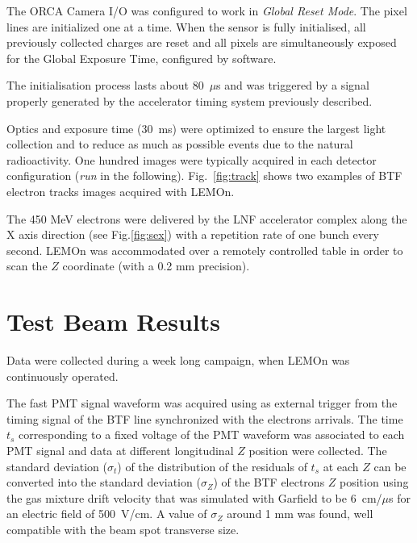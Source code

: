 \documentclass[review]{elsarticle}
\begin{document}
The ORCA Camera I/O was configured to work in {\it Global Reset Mode}. The pixel lines are initialized one at a time. When the sensor is fully initialised, all previously collected charges are reset and all pixels are simultaneously exposed  for the Global Exposure Time, configured by software. 

The initialisation process lasts about 80~$\mu$s and was triggered by a signal properly generated by the accelerator timing system previously described.



Optics and exposure time (30~ms) were optimized to ensure the largest light collection and to reduce as much as possible events due to the natural radioactivity. One hundred images were typically acquired in each detector configuration ({\it run} in the following). 
Fig.~\ref{fig:track} shows two examples of BTF electron tracks images acquired with LEMOn.

The 450 MeV electrons were delivered by the LNF accelerator complex  along the X axis direction (see Fig.\ref{fig:sex})  with a repetition rate of one bunch every  second. LEMOn was accommodated over a remotely controlled table  in order to scan 
the $Z$ coordinate (with a 0.2 mm precision). 



\section{Test Beam Results}

Data were collected during a week long campaign, when LEMOn was continuously operated. 

The fast PMT signal waveform was acquired using as external trigger from the timing signal of the BTF line synchronized with the electrons arrivals. The time $t_{s}$ corresponding to a fixed voltage of the PMT waveform was associated to each PMT signal and data at different longitudinal $Z$ position were collected. 
The standard deviation ($\sigma_t$) of the distribution of the residuals of $t_{s}$ at each $Z$ can be converted into the standard deviation ($\sigma_Z$) of the BTF electrons $Z$ position using the gas mixture drift velocity that was simulated with Garfield \cite{bib:garfield} to be 6~cm/$\mu$s for an electric field of 500~V/cm. A value of $\sigma_Z$ around  1 mm  was found,  well compatible with the  beam spot transverse size. 
\end{document}
